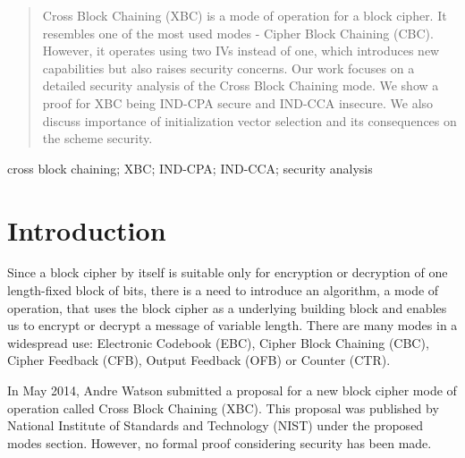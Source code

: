 \documentclass[conference]{IEEEtran}
\begin{document}
\begin{abstract}
Cross Block Chaining (XBC) is a mode of operation for a block cipher. It resembles one of the most used modes - Cipher Block Chaining (CBC). However, it operates using two IVs instead of one, which introduces new capabilities but also raises security concerns. Our work focuses on a detailed security analysis of the Cross Block Chaining mode. We show a proof for XBC being IND-CPA secure and IND-CCA insecure. We also discuss importance of initialization vector selection and its consequences on the scheme security.
\end{abstract}

\begin{keywords}
cross block chaining; XBC; IND-CPA; IND-CCA; security analysis
\end{keywords}

%
\IEEEpeerreviewmaketitle

\section{Introduction}

Since a block cipher by itself is suitable only for encryption or decryption of one length-fixed block of bits, there is a need to introduce an algorithm, a mode of operation, that uses the block cipher as a underlying building block and enables us to encrypt or decrypt a message of variable length. There are many modes in a widespread use: Electronic Codebook (EBC), Cipher Block Chaining (CBC), Cipher Feedback (CFB), Output Feedback (OFB) or Counter (CTR).

In May 2014, Andre Watson submitted a proposal for a new block cipher mode of operation called Cross Block Chaining (XBC). This proposal was published by National Institute of Standards and Technology (NIST) under the proposed modes section. However, no formal proof considering security has been made.
\end{document}

